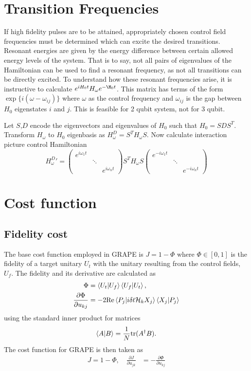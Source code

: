 \documentclass[12pt]{article}
\begin{document}
\section{Transition Frequencies}
If high fidelity pulses are to be attained, appropriately chosen control field frequencies must be determined which can excite the desired transitions. Resonant energies are given by the energy difference between certain allowed energy levels of the system. That is to say, not all pairs of eigenvalues of the Hamiltonian can be used to find a resonant frequency, as not all transitions can be directly excited. To understand how these resonant frequencies arise, it is instructive to calculate $e^{iH_0t}H_\omega e^{-\H_0 t}$. This matrix has terms of the form $\exp\{i(\omega-\omega_{ij})\}$ where $\omega$ as the control frequency and $\omega_{ij}$ is the gap between $H_0$ eigenstates $i$ and $j$. This is feasible for 2 qubit system, not for 3 qubit.

Let $S$,$D$ encode the eigenvectors and eigenvalues of $H_0$ such that $H_0 = SDS^T$. Transform $H_\omega$ to $H_0$ eigenbasis as $H_\omega^D=S^TH_\omega S$. Now calculate interaction picture control Hamiltonian 
\begin{equation}
    H_\omega^D' = \begin{pmatrix}
    e^{i\omega_1 t}\\
    &\ddots\\ & & e^{i\omega_n t}\end{pmatrix} S^TH_\omega S
     \begin{pmatrix}
    e^{-i\omega_1 t}\\
    &\ddots\\ & & e^{-i\omega_n t}\end{pmatrix}
\end{equation}

\section{Cost function}
\subsection{Fidelity cost}
The base cost function employed in GRAPE is $J=1-\Phi$ where $\Phi\in [0,1]$ is  the fidelity of a target unitary $U_t$ with the unitary resulting from the control fields, $U_f$. The fidelity and its derivative are calculated as\cite{rowland_implementing_2012}
\begin{align}
    \Phi&=\bra{U_t}\ket{U_f}\bra{U_f}\ket{U_t},\\
    \frac{\partial\Phi}{\partial u_{kj}} &= -2\text{Re}\bra{P_j}\ket{i\delta t\mathcal{H}_k X_j}\bra{X_j}\ket{P_j}
\end{align}
using the standard inner product for matrices
\begin{equation}
    \bra{A}\ket{B} = \frac{1}{N}\text{tr}(A^\dagger B).
\end{equation}
The cost function for GRAPE is then taken as
\begin{align}
    J = 1-\Phi,\quad
    \frac{\partial J}{\partial u_{jk}} &= -\frac{\partial\Phi}{\partial u_{kj}}
\end{align}
\end{document}
